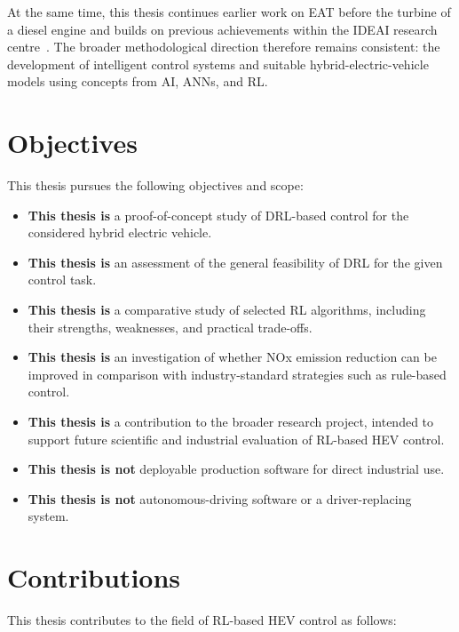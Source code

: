 At the same time, this thesis continues earlier work on \ac{EAT} before the turbine of a diesel engine and builds on previous achievements within the IDEAI research centre~\cite{cuberos_munoz_developing_2025, universitat_politecnica_de_catalunya_development_2025}. The broader methodological direction therefore remains consistent: the development of intelligent control systems and suitable hybrid-electric-vehicle models using concepts from \ac{AI}, \acp{ANN}, and \ac{RL}.

\section{Objectives}
\label{sec:objectives}
This thesis pursues the following objectives and scope:

\begin{itemize}
  \item \textbf{This thesis is} a proof-of-concept study of DRL-based control for the considered hybrid electric vehicle.
  \item \textbf{This thesis is} an assessment of the general feasibility of DRL for the given control task.
  \item \textbf{This thesis is} a comparative study of selected RL algorithms, including their strengths, weaknesses, and practical trade-offs.
  \item \textbf{This thesis is} an investigation of whether \ac{NOx} emission reduction can be improved in comparison with industry-standard strategies such as rule-based control.
  \item \textbf{This thesis is} a contribution to the broader research project, intended to support future scientific and industrial evaluation of RL-based HEV control.
  \item \textbf{This thesis is not} deployable production software for direct industrial use.
  \item \textbf{This thesis is not} autonomous-driving software or a driver-replacing system.
\end{itemize}

\section{Contributions}
This thesis contributes to the field of \ac{RL}-based \ac{HEV} control as follows:

